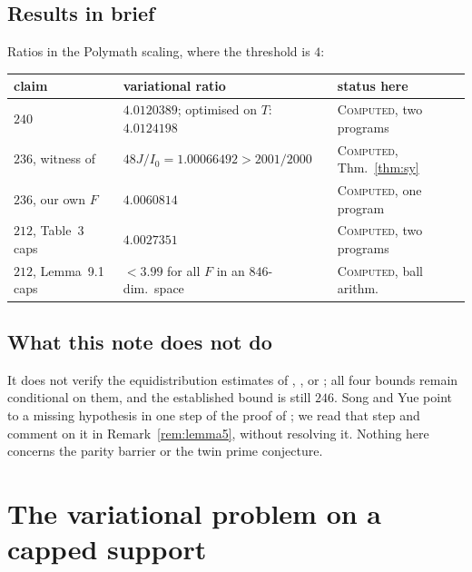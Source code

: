 \documentclass[11pt]{amsart}
\theoremstyle{definition}
\theoremstyle{remark}
\newcommand{\lbl}[1]{\textup{\textsc{#1}}}
\begin{document}
\subsection*{Results in brief}
Ratios in the Polymath scaling, where the threshold is $4$:
\begin{center}\small
\begin{tabular}{@{}lll@{}}
\toprule
claim & variational ratio & status here\\
\midrule
$240$ & $4.0120389$; optimised on $T$: $4.0124198$ & \lbl{Computed}, two programs\\
$236$, witness of \cite{SY26} & $48J/I_0=1.00066492>2001/2000$ & \lbl{Computed}, Thm.~\ref{thm:sy}\\
$236$, our own $F$ & $4.0060814$ & \lbl{Computed}, one program\\
$212$, Table~3 caps & $4.0027351$ & \lbl{Computed}, two programs\\
$212$, Lemma~9.1 caps & $<3.99$ for all $F$ in an $846$-dim.\ space & \lbl{Computed}, ball arithm.\\
\bottomrule
\end{tabular}
\end{center}

\subsection*{What this note does not do}
It does not verify the equidistribution estimates of \cite{Sta26},
\cite{Kin26}, \cite{SY26} or \cite{Cha26}; all four bounds remain conditional
on them, and the established bound is still $246$. Song and Yue
\cite[Remark~4.23]{SY26} point to a missing hypothesis in one step of the
proof of \cite[Lemma~5]{Sta26}; we read that step and comment on it in
Remark~\ref{rem:lemma5}, without resolving it. Nothing here concerns the
parity barrier or the twin prime conjecture.

\section{The variational problem on a capped support}
\end{document}
